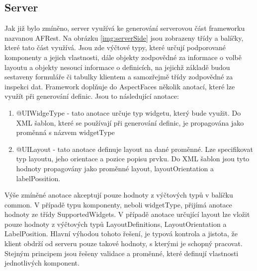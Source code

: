 \subsection{Server}
Jak již bylo zmíněno, server využívá ke generování serverovou část frameworku nazvanou AFRest. Na obrázku \ref{img:serverSide} jsou zobrazeny třídy a balíčky, které tato část využívá. Jsou zde výčtové typy, které určují podporované komponenty a jejich vlastnosti, dále objekty zodpovědné za informace o volbě layoutu a objekty nesoucí informace o definicích, na jejichž základě budou sestaveny formuláře či tabulky klientem a samozřejmě třídy zodpovědné za inspekci dat. Framework doplňuje do AspectFaces několik anotací, které lze využít při generování definic. Jsou to následující anotace:
\begin{enumerate}
\item @UIWidgeType - tato anotace určuje typ widgetu, který bude využit. Do XML šablon, které se používají při generování definic, je propagována jako proměnná s názvem widgetType
\item @UILayout - tato anotace definuje layout na dané proměnné. Lze specifikovat typ layoutu, jeho orientace a pozice popisu prvku. Do XML šablon jsou tyto hodnoty propagovány jako proměnné layout, layoutOrientation a labelPossition. 
\end{enumerate}
Výše zmíněné anotace akceptují pouze hodnoty z výčtových typů v balíčku common. V případě typu komponenty, neboli widgetType, přijímá anotace hodnoty ze třídy SupportedWidgets. V případě anotace určující layout lze vložit pouze hodnoty z výčtových typů LayoutDefinitions, LayoutOrientation a LabelPosition. Hlavní výhodou tohoto řešení, je typová kontrola a jistota, že klient obdrží od serveru pouze takové hodnoty, s kterými je schopný pracovat. Stejným principem jsou řešeny validace a proměnné, které definují vlastnosti jednotlivých komponent. 

